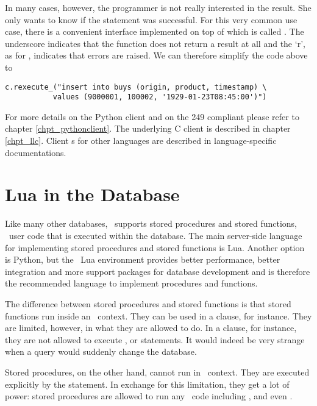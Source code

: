 In many cases, however, the programmer is not really interested
in the result. She only wants to know if the statement was
successful. For this very common use case, there is a convenient
interface implemented on top of  which is called
. The underscore indicates that the function
does not return a result at all and the `r', as for ,
indicates that errors are raised.
We can therefore simplify the code above to  

\begin{minipage}{\textwidth}
\begin{python}
\begin{lstlisting}
c.rexecute_("insert into buys (origin, product, timestamp) \
           values (9000001, 100002, '1929-01-23T08:45:00')")
\end{lstlisting}
\end{python}
\end{minipage}

For more details on the Python client
and on the  249 compliant 
please refer to chapter \ref{chpt_pythonclient}.
The underlying C client \acronym{api} is described in
chapter \ref{chpt_llc}.
Client s for other languages are described
in language-specific documentations.

\section{Lua in the Database}
Like many other databases,
\nowdb\ supports
stored procedures and stored functions,
\ie\ user code that is executed within the database.
The main server-side language
for implementing stored procedures and
stored functions is Lua.
Another option is Python,
but the \nowdb\ Lua environment
provides better performance,
better integration and more support
packages for database development
and is therefore the recommended
language to implement procedures and functions.

The difference between stored procedures
and stored functions is that stored functions
run inside an \sql\ context. They
can be used in a  clause,
for instance. They are limited, however,
in what they are allowed to do.
In a  clause, for instance,
they are not allowed to
execute ,  or 
statements.
It would indeed be very strange when
a query would suddenly change the database.

Stored procedures, on the other hand,
cannot run in \sql\ context. They are
executed explicitly by the 
statement. In exchange for this limitation,
they get a lot of power:
stored procedures are allowed to run
any \sql\ code including , 
and even .

